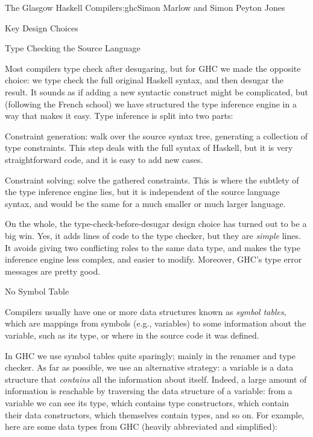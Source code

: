 \begin{aosachapter}{The Glasgow Haskell Compiler}{s:ghc}{Simon Marlow and Simon Peyton Jones}
\begin{aosasect1}{Key Design Choices}
\begin{aosasect2}{Type Checking the Source Language}
\begin{aosaitemize}
\end{aosaitemize}

Most compilers type check after desugaring, but for GHC we made the
opposite choice: we type check the full original Haskell syntax, and
then desugar the result.  It sounds as if adding a new syntactic
construct might be complicated, but (following the French school) we
have structured the type inference engine in a way that makes it
easy. Type inference is split into two parts:

\begin{aosaenumerate}

\item Constraint generation: walk over the source syntax tree,
  generating a collection of type constraints.  This step deals with
  the full syntax of Haskell, but it is very straightforward code, and
  it is easy to add new cases.

\item Constraint solving: solve the gathered constraints.  This is
  where the subtlety of the type inference engine lies, but it is
  independent of the source language syntax, and would be the same for
  a much smaller or much larger language.

\end{aosaenumerate}

On the whole, the type-check-before-desugar design choice has turned
out to be a big win.  Yes, it adds lines of code to the type checker,
but they are \emph{simple} lines. It avoids giving two conflicting
roles to the same data type, and makes the type inference engine less
complex, and easier to modify. Moreover, GHC's type error messages are
pretty good.

\end{aosasect2}

\begin{aosasect2}{No Symbol Table}

Compilers usually have one or more data structures known as
\emph{symbol tables}, which are mappings from symbols
(e.g., variables) to some information about the variable, such as its
type, or where in the source code it was defined.

In GHC we use symbol tables quite sparingly; mainly in the renamer and
type checker.  As far as possible, we use an alternative strategy: a
variable is a data structure that \emph{contains} all the information
about itself.  Indeed, a large amount of information is reachable by
traversing the data structure of a variable: from a variable we can
see its type, which contains type constructors, which contain their
data constructors, which themselves contain types, and so on.  For
example, here are some data types from GHC (heavily abbreviated and
simplified):


\end{aosasect2}
\end{aosasect1}
\end{aosachapter}
